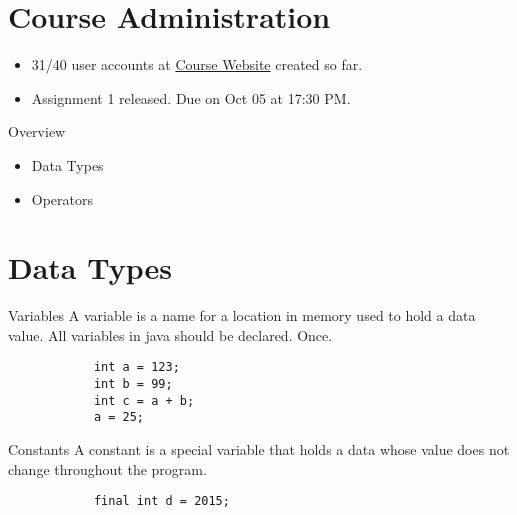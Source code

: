 \documentclass[10pt, compress]{beamer}
\begin{document}
\prepareCover

\section{Course Administration}

\begin{slide}
	\begin{itemize}
		\item[] 31/40 user accounts at \href{http://www.ghorbanzade.com}{Course Website} created so far.
		\item[] Assignment 1 released. Due on Oct 05 at 17:30 PM.
	\end{itemize}
\end{slide}

\begin{slide}
	\begin{block}{Overview}
		\begin{itemize}
			\item[] Data Types
			\item[] Operators
		\end{itemize}
	\end{block}
\end{slide}

\section{Data Types}

\begin{slide}
	\begin{block}{Variables}
		A variable is a name for a location in memory used to hold a data value. All variables in java should be declared. Once.
		\begin{verbatim}
			int a = 123;
			int b = 99;
			int c = a + b;
			a = 25;
		\end{verbatim}
	\end{block}
	\begin{block}{Constants}
		A constant is a special variable that holds a data whose value does not change throughout the program.
		\begin{verbatim}
			final int d = 2015;
		\end{verbatim}
	\end{block}
\end{slide}
\end{document}
